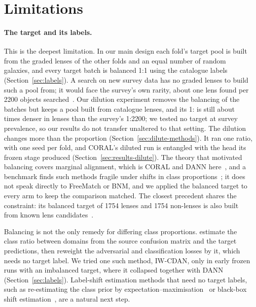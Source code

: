 \section{Limitations}
\label{sec:limitations}

\paragraph{The target and its labels.} This is the deepest limitation. In our main design each
fold's target pool is built from the graded lenses of the other folds and an equal number of
random galaxies, and every target batch is balanced 1:1 using the catalogue labels
(Section~\ref{sec:labels}). A search on new survey data has no graded lenses to build such a
pool from; it would face the survey's own rarity, about one lens found per 2200 objects
searched~\citep{lines2025simstosky}. Our dilution experiment
removes the balancing of the batches but keeps a pool built from catalogue lenses, and its
1:\dlRatio{} is still about \dlDenserWord{} times denser in lenses than the survey's 1:2200; we
tested no target at survey prevalence, so our results do not transfer unaltered to that
setting. The dilution changes more than the proportion (Section~\ref{sec:dilute-methods}). It ran one ratio, with one seed per fold, and CORAL's diluted run is entangled
with the head its frozen stage produced (Section~\ref{sec:results-dilute}). The theory that
motivated balancing covers marginal alignment, which is CORAL and
DANN here~\citep{zhao2019invariant, zhao2020gls}, and a benchmark finds such methods fragile
under shifts in class proportions~\citep{classimbalanceda}; it does not speak directly to FreeMatch or
BNM, and we applied the balanced target to every arm to keep the comparison matched. The
closest precedent shares the constraint: its balanced target of 1754 lenses and 1754
non-lenses is also built from known lens candidates~\citep{parul2024}.

Balancing is not the only remedy for differing class proportions. \citet{zhao2020gls} estimate
the class ratio between domains from the source confusion matrix and the target predictions,
then reweight the adversarial and classification losses by it, which needs no target label. We
tried one such method, IW-CDAN, only in early frozen runs with an imbalanced target, where it
collapsed together with DANN (Section~\ref{sec:labels}). Label-shift estimation methods that
need no target labels, such as re-estimating the class prior by
expectation--maximisation~\citep{saerens2002} or black-box shift
estimation~\citep{lipton2018}, are a natural next step.

